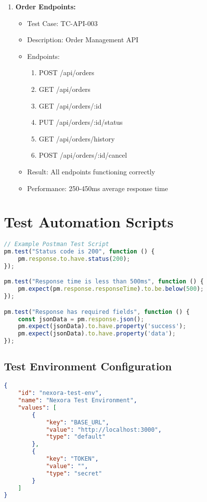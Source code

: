 \begin{enumerate}
    \item \textbf{Order Endpoints:}
    \begin{itemize}
        \item Test Case: TC-API-003
        \item Description: Order Management API
        \item Endpoints:
        \begin{enumerate}
            \item POST /api/orders
            \item GET /api/orders
            \item GET /api/orders/:id
            \item PUT /api/orders/:id/status
            \item GET /api/orders/history
            \item POST /api/orders/:id/cancel
        \end{enumerate}
        \item Result: All endpoints functioning correctly
        \item Performance: 250-450ms average response time
    \end{itemize}
\end{enumerate}


\section{Test Automation Scripts}
\begin{lstlisting}[language=JavaScript]
// Example Postman Test Script
pm.test("Status code is 200", function () {
    pm.response.to.have.status(200);
});

pm.test("Response time is less than 500ms", function () {
    pm.expect(pm.response.responseTime).to.be.below(500);
});

pm.test("Response has required fields", function () {
    const jsonData = pm.response.json();
    pm.expect(jsonData).to.have.property('success');
    pm.expect(jsonData).to.have.property('data');
});
\end{lstlisting}

\subsection{Test Environment Configuration}
\begin{lstlisting}[language=JSON]
{
    "id": "nexora-test-env",
    "name": "Nexora Test Environment",
    "values": [
        {
            "key": "BASE_URL",
            "value": "http://localhost:3000",
            "type": "default"
        },
        {
            "key": "TOKEN",
            "value": "",
            "type": "secret"
        }
    ]
}
\end{lstlisting}

